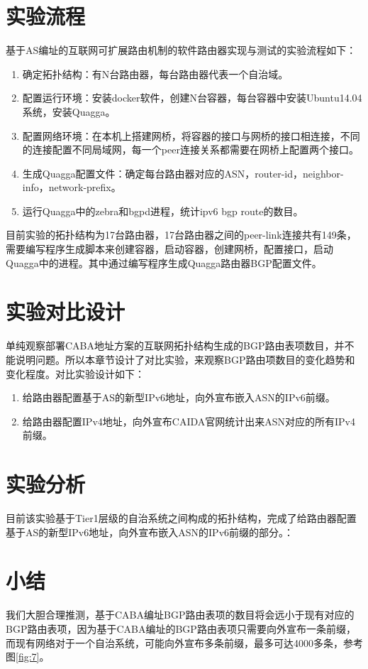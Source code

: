 \section{实验流程}
基于AS编址的互联网可扩展路由机制的软件路由器实现与测试的实验流程如下：
\begin{enumerate}
\item 确定拓扑结构：有N台路由器，每台路由器代表一个自治域。
\item 配置运行环境：安装docker软件，创建N台容器，每台容器中安装Ubuntu14.04系统，安装Quagga。
\item 配置网络环境：在本机上搭建网桥，将容器的接口与网桥的接口相连接，不同的连接配置不同局域网，每一个peer连接关系都需要在网桥上配置两个接口。
\item 生成Quagga配置文件：确定每台路由器对应的ASN，router-id，neighbor-info，network-prefix。
\item 运行Quagga中的zebra和bgpd进程，统计ipv6 bgp route的数目。
\end{enumerate}
目前实验的拓扑结构为17台路由器，17台路由器之间的peer-link连接共有149条，需要编写程序生成脚本来创建容器，启动容器，创建网桥，配置接口，启动Quagga中的进程。其中通过编写程序生成Quagga路由器BGP配置文件。
\section{实验对比设计}
单纯观察部署CABA地址方案的互联网拓扑结构生成的BGP路由表项数目，并不能说明问题。所以本章节设计了对比实验，来观察BGP路由项数目的变化趋势和变化程度。对比实验设计如下：
\begin{enumerate}
\item 给路由器配置基于AS的新型IPv6地址，向外宣布嵌入ASN的IPv6前缀。
\item 给路由器配置IPv4地址，向外宣布CAIDA官网统计出来ASN对应的所有IPv4前缀。
\end{enumerate}
\section{实验分析}

目前该实验基于Tier1层级的自治系统之间构成的拓扑结构，完成了给路由器配置基于AS的新型IPv6地址，向外宣布嵌入ASN的IPv6前缀的部分。：

\section{小结}
我们大胆合理推测，基于CABA编址BGP路由表项的数目将会远小于现有对应的BGP路由表项，因为基于CABA编址的BGP路由表项只需要向外宣布一条前缀，而现有网络对于一个自治系统，可能向外宣布多条前缀，最多可达4000多条，参考图\ref{fig:7}。